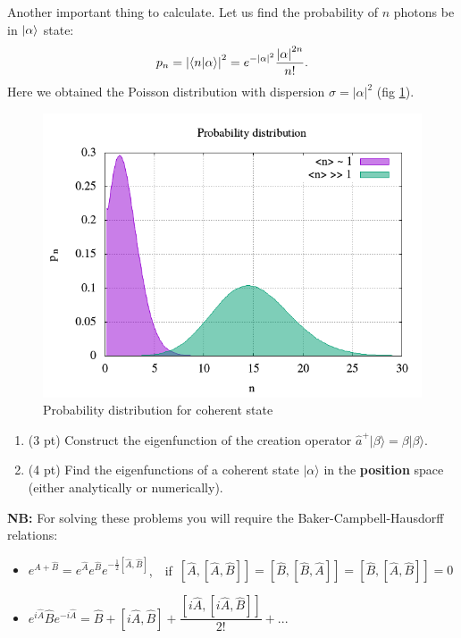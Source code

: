 Another important thing to calculate. Let us find the probability of $n$ photons be in $\left\lvert {\alpha} \right\rangle$ state:
\begin{equation}
	p_n = \left| \langle {n} \lvert {\alpha} \rangle \right|^2 = e^{- \left|\alpha\right|^2} \frac{\left|\alpha\right|^{2n}}{n!}.
\end{equation}
Here we obtained the Poisson distribution with dispersion $\sigma = \left|\alpha\right|^2$ (fig \ref{fig:2_1}).
\begin{figure}
	\centering
	\includegraphics[width=0.7\linewidth]{fig/L2/2_1}
	\caption{Probability distribution for coherent state}
	\label{fig:2_1}
\end{figure}




\begin{hw}
	\begin{enumerate}
	\item (3 pt) Construct the eigenfunction of the creation operator  $\hat a^{+}|\beta \rangle=\beta|\beta \rangle$.
	
	
	\item (4 pt) Find the eigenfunctions of a coherent state $|\alpha \rangle$ in  the \textbf{position} space (either analytically or numerically).
	
	
	\end{enumerate}
	
	
	{\bf NB:} For solving these problems  you will require the Baker-Campbell-Hausdorff  relations:
	\begin{itemize}
	\item $e^{\hat A+\hat B}=e^{\hat A}e^{\hat B}e^{-\frac{1}{2}[\hat A, \hat B]}$,\ \  if\  $[\hat A,[\hat A,\hat B]]=[\hat B,[\hat B,\hat A]]=[\hat B,[\hat A,\hat B]]=0$
	\item $e^{i\hat A}\hat Be^{-i\hat A} = \hat B + [i\hat A,\hat B] + \dfrac{[i\hat A,[i\hat A,\hat B]]}{2!} + ...$
	\end{itemize}
\end{hw}


